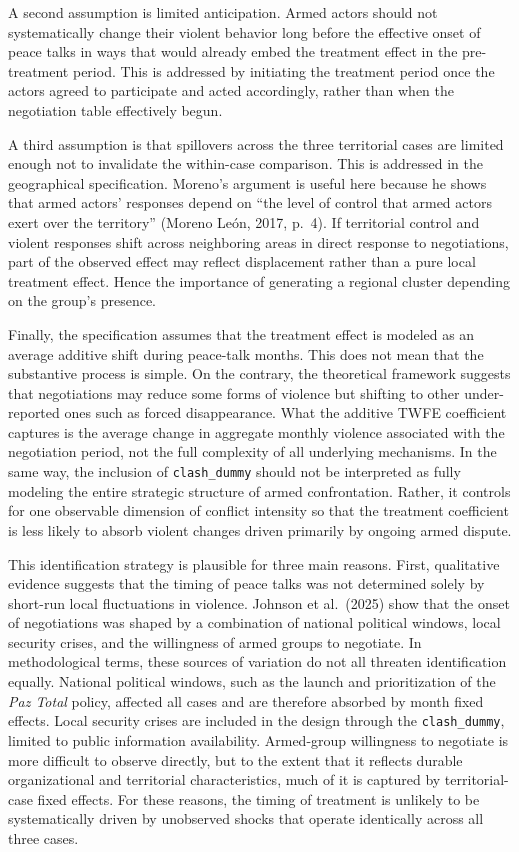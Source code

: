 \documentclass[11pt]{article}
\begin{document}
A second assumption is limited anticipation. Armed actors should not systematically change their violent behavior long before the effective onset of peace talks in ways that would already embed the treatment effect in the pre-treatment period. This is addressed by initiating the treatment period once the actors agreed to participate and acted accordingly, rather than when the negotiation table effectively begun. 

A third assumption is that spillovers across the three territorial cases are limited enough not to invalidate the within-case comparison. This is addressed in the geographical specification. Moreno's argument is useful here because he shows that armed actors' responses depend on ``the level of control that armed actors exert over the territory'' (Moreno León, 2017, p.~4). If territorial control and violent responses shift across neighboring areas in direct response to negotiations, part of the observed effect may reflect displacement rather than a pure local treatment effect. Hence the importance of generating a regional cluster depending on the group's presence.

Finally, the specification assumes that the treatment effect is modeled as an average additive shift during peace-talk months. This does not mean that the substantive process is simple. On the contrary, the theoretical framework suggests that negotiations may reduce some forms of violence but shifting to other under-reported ones such as forced disappearance. What the additive TWFE coefficient captures is the average change in aggregate monthly violence associated with the negotiation period, not the full complexity of all underlying mechanisms. In the same way, the inclusion of \texttt{clash\_dummy} should not be interpreted as fully modeling the entire strategic structure of armed confrontation. Rather, it controls for one observable dimension of conflict intensity so that the treatment coefficient is less likely to absorb violent changes driven primarily by ongoing armed dispute.

This identification strategy is plausible for three main reasons. First, qualitative evidence suggests that the timing of peace talks was not determined solely by short-run local fluctuations in violence. Johnson et al.~(2025) show that the onset of negotiations was shaped by a combination of national political windows, local security crises, and the willingness of armed groups to negotiate. In methodological terms, these sources of variation do not all threaten identification equally. National political windows, such as the launch and prioritization of the \textit{Paz Total} policy, affected all cases and are therefore absorbed by month fixed effects. Local security crises are included in the design through the \texttt{clash\_dummy}, limited to public information availability. Armed-group willingness to negotiate is more difficult to observe directly, but to the extent that it reflects durable organizational and territorial characteristics, much of it is captured by territorial-case fixed effects. For these reasons, the timing of treatment is unlikely to be systematically driven by unobserved shocks that operate identically across all three cases.
\end{document}
